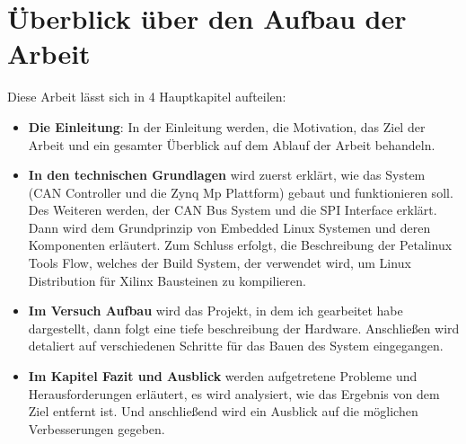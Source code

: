 \section{Überblick über den Aufbau der Arbeit}
\label{sec:Einleitung:Aufbau_der_Arbeit}

Diese Arbeit lässt sich in 4 Hauptkapitel aufteilen:
\begin{itemize}
	\item \textbf{Die Einleitung}: In der Einleitung werden, die Motivation, das Ziel der Arbeit und ein gesamter Überblick auf dem Ablauf der Arbeit behandeln.
	\item  \textbf{In den technischen Grundlagen} wird zuerst erklärt, wie das System (CAN Controller und die Zynq Mp Plattform) gebaut und funktionieren soll. Des Weiteren werden, der CAN Bus System und die SPI Interface erklärt. Dann wird dem Grundprinzip von Embedded Linux Systemen und deren Komponenten erläutert. Zum Schluss erfolgt, die Beschreibung der Petalinux Tools Flow, welches der Build System, der verwendet wird, um Linux Distribution für Xilinx Bausteinen zu kompilieren.
	\item \textbf{Im Versuch Aufbau} wird das Projekt, in dem ich gearbeitet habe dargestellt, dann folgt eine tiefe beschreibung der Hardware. Anschließen wird detaliert auf verschiedenen Schritte für das Bauen des System eingegangen. 
	\item \textbf{Im Kapitel Fazit und Ausblick} werden aufgetretene Probleme und Herausforderungen erläutert, es wird analysiert, wie  das Ergebnis von dem Ziel entfernt ist. Und anschließend wird ein Ausblick auf die möglichen Verbesserungen gegeben. 
\end{itemize}

